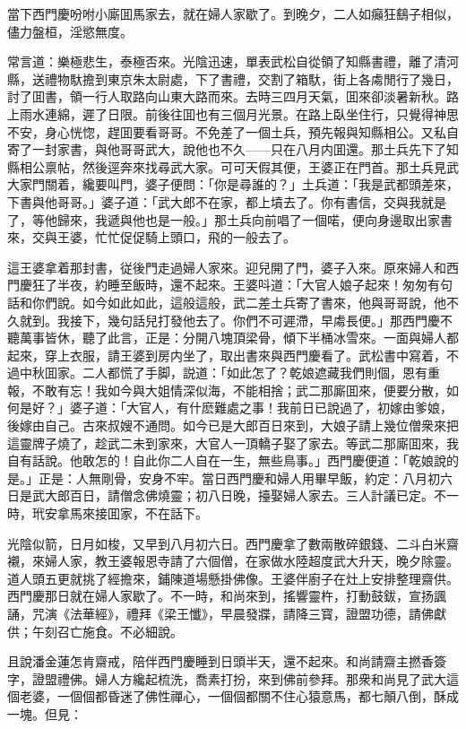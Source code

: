 當下西門慶吩咐小廝囬馬家去，就在婦人家歇了。到晚夕，二人如癲狂鷂子相似，儘力盤桓，淫慾無度。

常言道：樂極悲生，泰極否來。光陰迅速，單表武松自從領了知縣書禮，離了清河縣，送禮物馱擔到東京朱太尉處，下了書禮，交割了箱馱，街上各䖏閒行了幾日，討了囬書，領一行人取路向山東大路而來。去時三四月天氣，囬來卻淡暑新秋。路上雨水連綿，遲了日限。前後往囬也有三個月光景。在路上臥坐住行，只覺得神思不安，身心恍惚，趕囬要看哥哥。不免差了一個土兵，預先報與知縣相公。又私自寄了一封家書，與他哥哥武大，說他也不久——只在八月内囬還。那土兵先下了知縣相公禀帖，然後逕奔來找尋武大家。可可天假其便，王婆正在門首。那土兵見武大家門關着，纔要叫門，婆子便問：「你是尋誰的？」土兵道：「我是武都頭差來，下書與他哥哥。」婆子道：「武大郎不在家，都上墳去了。你有書信，交與我就是了，等他歸來，我遞與他也是一般。」那土兵向前唱了一個喏，便向身邊取出家書來，交與王婆，忙忙促促騎上頭口，飛的一般去了。

這王婆拿着那封書，従後門走過婦人家來。迎兒開了門，婆子入來。原來婦人和西門慶狂了半夜，約睡至飯時，還不起來。王婆呌道：「大官人娘子起來！匆匆有句話和你們說。如今如此如此，這般這般，武二差土兵寄了書來，他與哥哥說，他不久就到。我接下，幾句話兒打發他去了。你們不可遲滯，早䖏長便。」那西門慶不聽萬事皆休，聽了此言，正是：分開八塊頂梁骨，傾下半桶冰雪來。一面與婦人都起來，穿上衣服，請王婆到房内坐了，取出書來與西門慶看了。武松書中寫着，不過中秋囬家。二人都慌了手脚，説道：「如此怎了？乾娘遮藏我們則個，恩有重報，不敢有忘！我如今與大姐情深似海，不能相捨；武二那廝囬來，便要分散，如何是好？」婆子道：「大官人，有什麽難處之事！我前日已說過了，初嫁由爹娘，後嫁由自己。古來叔嫂不通問。如今已是大郎百日來到，大娘子請上幾位僧衆來把這靈牌子燒了，趁武二未到家來，大官人一頂轎子娶了家去。等武二那廝囬來，我自有話說。他敢怎的！自此你二人自在一生，無些鳥事。」西門慶便道：「乾娘說的是。」正是：人無剛骨，安身不牢。當日西門慶和婦人用畢早飯，約定：八月初六日是武大郎百日，請僧念佛燒靈；初八日晚，擡娶婦人家去。三人計議已定。不一時，玳安拿馬來接囬家，不在話下。

光陰似箭，日月如梭，又早到八月初六日。西門慶拿了數兩散碎銀錢、二斗白米齋襯，來婦人家，教王婆報恩寺請了六個僧，在家做水陸超度武大升天，晚夕除靈。道人頭五更就挑了經擔來，鋪陳道場懸掛佛像。王婆伴廚子在灶上安排整理齋供。西門慶那日就在婦人家歇了。不一時，和尚來到，搖響靈杵，打動鼓鈸，宣扬諷誦，咒演《法華經》，禮拜《梁王懺》，早晨發牃，請降三寳，證盟功德，請佛獻供；午刻召亡施食。不必細說。

且說潘金蓮怎肯齋戒，陪伴西門慶睡到日頭半天，還不起來。和尚請齋主撚香簽字，證盟禮佛。婦人方纔起梳洗，喬素打扮，來到佛前參拜。那衆和尚見了武大這個老婆，一個個都昏迷了佛性禪心，一個個都關不住心猿意馬，都七顛八倒，酥成一塊。但見：

